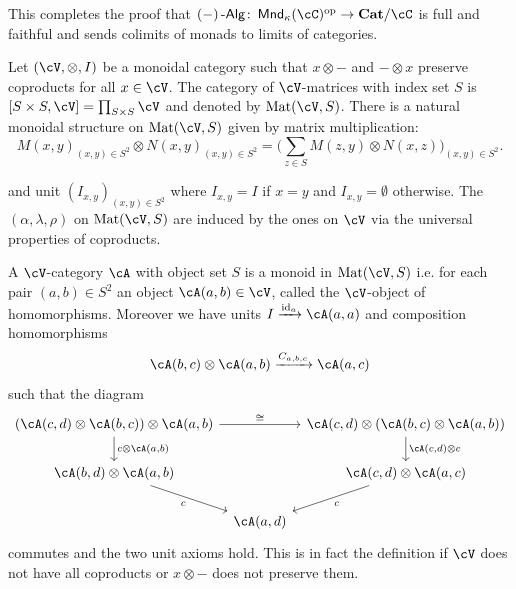 \documentclass[a4paper,11pt,oneside,openany]{scrbook}
\begin{document}
\begin{rmk}
	This completes the proof that $ (-)\Alg \from \Mnd_\kappa(\cC)^{\text{op}} \to \Cat/\cC$ is full and faithful and sends colimits of monads to limits of categories.
\end{rmk}
Let $ (\cV,\otimes, I) $ be a monoidal category such that $ x\otimes - $ and $ -\otimes x $ preserve coproducts for all $ x\in\cV$.
The category of $\cV$-matrices with index set $ S $ is $ [S\times S,\cV] =\prod_{S\times S}\cV $ and denoted by $ \Mat(\cV ,     S) $. There is a natural monoidal structure on $ \Mat(\cV,S) $ given by matrix multiplication:
\begin{displaymath}
	M(x,y)_{(x,y) \in S^2} \otimes N(x,y)_{(x,y) \in S^2} = \Big(\sum_{z\in S} M(z,y)\otimes N(x,z) \Big)_{(x,y)\in S^2}.
\end{displaymath}

and unit $ (I_{x,y})_{(x,y) \in S^2} $ where $ I_{x,y}= I $ if $ x = y $ and $ I_{x,y} = \emptyset $ otherwise.
The $ (\alpha,\lambda,\rho) $ on $ \Mat(\cV , S) $ are induced by the ones on $\cV$ via the universal properties of coproducts.

\begin{defn}
	A $\cV$-category $ \cA $ with object set $ S $ is a monoid in $ \Mat(\cV,S) $
	i.e. for each pair $ (a,b) \in S^2 $ an object $ \cA(a,b) \in\cV$, called the $\cV$-object of homomorphisms.
	Moreover we have units $ I\xrightarrow{\id_a} \cA(a,a) $ and composition homomorphisms
	\begin{displaymath}
		\cA(b,c) \otimes \cA(a,b) \xrightarrow{C_{a,b,c}} \cA(a,c)
	\end{displaymath}
	such that the diagram
	\begin{displaymath}
		\begin{tikzcd}[column sep=tiny]
			(\cA(c,d)\otimes \cA(b,c)) \otimes \cA(a,b)
			\arrow[d,"{c\otimes \cA(a,b)}"]\arrow[rr, "\cong"]
			&&
			\cA(c,d) \otimes (\cA(b,c) \otimes \cA(a,b) )
			\arrow[d,"{\cA(c,d)\otimes c}"]\\
			\cA(b,d)\otimes \cA(a,b)
			\arrow[rd, "c"']
			&&
			\cA(c,d)\otimes \cA(a,c)
			\arrow[ld, "c"]
			\\
			& \cA(a,d)
		\end{tikzcd}
	\end{displaymath}
	commutes and the two unit axioms hold.
	This is in fact the definition if $\cV$ does not have all coproducts or $ x\otimes - $ does not preserve them.
\end{defn}
\end{document}
